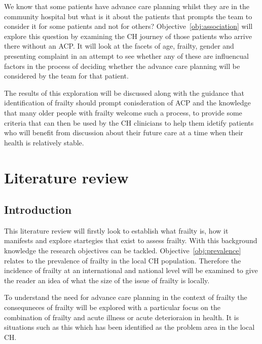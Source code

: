\documentclass
[
	12pt,
	a4paper,
	oneside,
]{report}
\begin{document}
We know that some patients have advance care planning whilst they are in the
community hospital but what is it about the patients that prompts the team to
consider it for some patients and not for others?
Objective~\ref{obj:association} will explore this question by examining the CH
journey of those patients 
who arrive there without an ACP. It will look at the facets of age, frailty, 
gender and presenting complaint in an attempt to see whether any of these are
influencual factors in the process of deciding whether the advance care planning
will be considered by the team for that patient.

The results of this exploration will be discussed along with the guidance that 
identification of frailty should prompt conisderation of ACP and the knowledge
that many older people with frailty welcome such a process, to provide some 
criteria that can then be used by the CH clinicians to help them idetify 
patients who will benefit from discussion about their future care at a time 
when their health is relatively stable.



\chapter{Literature review}

\section{Introduction}

This literature review will firstly look to establish what frailty is, how it
manifests and explore startegies that exist to assess frailty. With this 
background knowledge the research objectives can be tackled. 
Objective~\ref{obj:prevalence} relates to the prevalence of frailty in the
local CH population. Therefore the incidence of frailty at an international
and national level will be examined to give the reader an idea of what the
size of the issue of frailty is locally.

To understand the need for advance care planning in the context of frailty
the consequneces of frailty will be explored with a particular focus on the
combination of frailty and acute illness or acute deterioraion in health. 
It is situations such as this which has been identified as the problem area
in the local CH.
\end{document}
